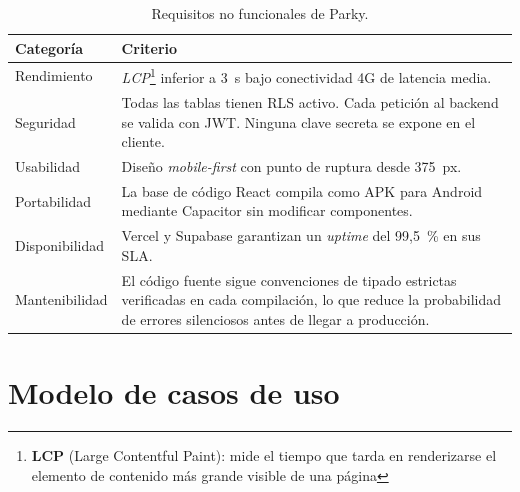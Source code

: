 \begin{table}[htbp]
  \centering
  \caption{Requisitos no funcionales de Parky.}
  \label{tab:rnf}
  \begin{tabularx}{\textwidth}{lX}
    \toprule
    \textbf{Categoría} & \textbf{Criterio}                                                                                                                                                                                                       \\
    \midrule
    \rowcolor{gray!5}
    Rendimiento        & \textit{LCP}\footnote{\textbf{LCP} (Large Contentful Paint): mide el tiempo que tarda en renderizarse el elemento de contenido más grande visible de una página} inferior a 3~s bajo conectividad 4G de latencia media. \\
    Seguridad          & Todas las tablas tienen RLS activo. Cada petición al backend se valida con JWT. Ninguna clave secreta se expone en el cliente.                                                                                          \\
    \rowcolor{gray!5}
    Usabilidad         & Diseño \textit{mobile-first} con punto de ruptura desde 375~px.                                                                                                                                                         \\
    Portabilidad       & La base de código React compila como APK para Android mediante Capacitor sin modificar componentes.                                                                                                                     \\
    \rowcolor{gray!5}
    Disponibilidad     & Vercel y Supabase garantizan un \textit{uptime} del 99,5~\% en sus SLA.                                                                                                                                                 \\
    Mantenibilidad     & El código fuente sigue convenciones de tipado estrictas verificadas en cada compilación, lo que reduce la probabilidad de errores silenciosos antes de llegar a producción.                                             \\
    \bottomrule
  \end{tabularx}
\end{table}

\section{Modelo de casos de uso}
\label{sec:casos_de_uso}

